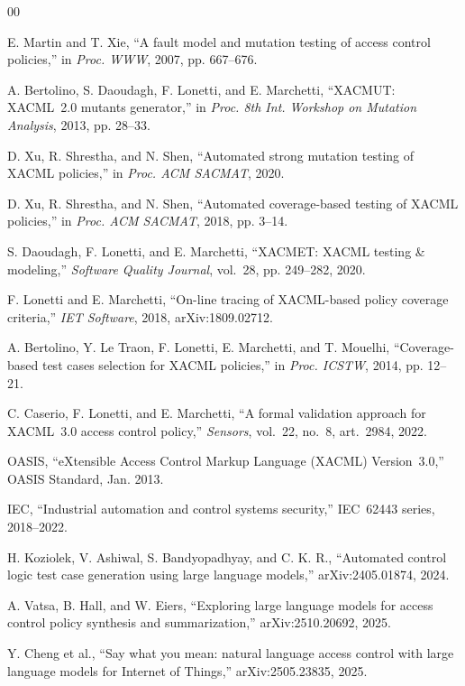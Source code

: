 \documentclass[conference]{IEEEtran}
\begin{document}
\balance
\begin{thebibliography}{00}

E. Martin and T. Xie, ``A fault model and mutation testing of access control
policies,'' in \textit{Proc. WWW}, 2007, pp. 667--676.

A. Bertolino, S. Daoudagh, F. Lonetti, and E. Marchetti, ``XACMUT: XACML~2.0
mutants generator,'' in \textit{Proc. 8th Int. Workshop on Mutation Analysis},
2013, pp. 28--33.

D. Xu, R. Shrestha, and N. Shen, ``Automated strong mutation testing of XACML
policies,'' in \textit{Proc. ACM SACMAT}, 2020.

D. Xu, R. Shrestha, and N. Shen, ``Automated coverage-based testing of XACML
policies,'' in \textit{Proc. ACM SACMAT}, 2018, pp. 3--14.

S. Daoudagh, F. Lonetti, and E. Marchetti, ``XACMET: XACML testing \&
modeling,'' \textit{Software Quality Journal}, vol.~28, pp. 249--282, 2020.

F. Lonetti and E. Marchetti, ``On-line tracing of XACML-based policy coverage
criteria,'' \textit{IET Software}, 2018, arXiv:1809.02712.

A. Bertolino, Y. Le Traon, F. Lonetti, E. Marchetti, and T. Mouelhi,
``Coverage-based test cases selection for XACML policies,'' in \textit{Proc.
ICSTW}, 2014, pp. 12--21.

C. Caserio, F. Lonetti, and E. Marchetti, ``A formal validation approach for
XACML~3.0 access control policy,'' \textit{Sensors}, vol.~22, no.~8, art.~2984,
2022.

OASIS, ``eXtensible Access Control Markup Language (XACML) Version~3.0,''
OASIS Standard, Jan. 2013.

IEC, ``Industrial automation and control systems security,'' IEC~62443 series,
2018--2022.

H. Koziolek, V. Ashiwal, S. Bandyopadhyay, and C. K. R., ``Automated control
logic test case generation using large language models,'' arXiv:2405.01874,
2024.

A. Vatsa, B. Hall, and W. Eiers, ``Exploring large language models for access
control policy synthesis and summarization,'' arXiv:2510.20692, 2025.

Y. Cheng et al., ``Say what you mean: natural language access control with
large language models for Internet of Things,'' arXiv:2505.23835, 2025.


\end{thebibliography}
\end{document}
